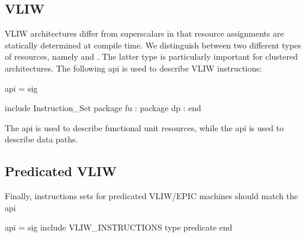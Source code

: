 \subsection{VLIW}
   VLIW architectures differ from superscalars in that
resource assignments are statically determined at compile time.
We distinguish between two different types of resources, namely
 and .  
The latter type is particularly
important for clustered architectures.
The following api
is used to describe VLIW instructions:
\begin{SML}
api  =
sig

   include Instruction_Set
   package fu : 
   package dp : 
end
\end{SML}
The api  is used to describe functional unit
resources, while the api  is used to describe
data paths.

\subsection{Predicated VLIW}

Finally, instructions sets for predicated VLIW/EPIC machines should match
the api 
\begin{SML}
api  =
sig
   include VLIW_INSTRUCTIONS
   type predicate
end
\end{SML}
